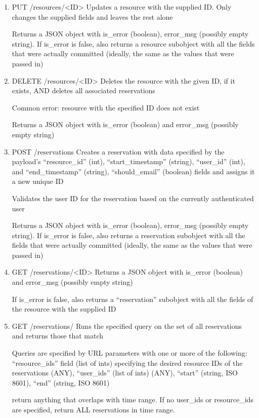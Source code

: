 \documentclass[12pt]{article}
\begin{document}
\begin{enumerate}
\item PUT /resources/<ID>
Updates a resource with the supplied ID. Only changes the supplied fields and leaves the rest alone

Returns a JSON object with is\_error (boolean), error\_msg (possibly empty string). If is\_error is false, also returns a resource subobject with all the fields that were actually committed (ideally, the same as the values that were passed in)

\item DELETE /resources/<ID>
Deletes the resource with the given ID, if it exists, AND deletes all associated reservations

Common error: resource with the specified ID does not exist

Returns a JSON object with is\_error (boolean) and error\_msg (possibly empty string)

\item POST /reservations
Creates a reservation with data specified by the payload's ``resource\_id'' (int), ``start\_timestamp'' (string), ``user\_id'' (int), and ``end\_timestamp'' (string), ``should\_email'' (boolean) fields and assigns it a new unique ID

Validates the user ID for the reservation based on the currently authenticated user

Returns a JSON object with is\_error (boolean), error\_msg (possibly empty string). If is\_error is false, also returns a reservation subobject with all the fields that were actually committed (ideally, the same as the values that were passed in)

\item GET /reservations/<ID>
Returns a JSON object with is\_error (boolean) and error\_msg (possibly empty string)

If is\_error is false, also returns a ``reservation'' subobject with all the fields of the resource with the supplied ID

\item GET /reservations/
Runs the specified query on the set of all reservations and returns those that match

Queries are specified by URL parameters with one or more of the following: ``resource\_ids'' field (list of ints) specifying the desired resource IDs of the reservations (ANY), ``user\_ids'' (list of ints) (ANY), ``start'' (string, ISO 8601), ``end'' (string, ISO 8601)

return anything that overlaps with time range. If no user\_ids or resource\_ids are specified, return ALL reservations in time range. 


\end{enumerate}
\end{document}
